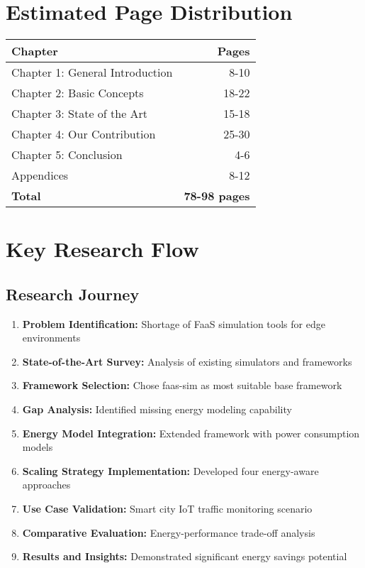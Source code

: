 \documentclass[12pt,a4paper]{report}
\begin{document}

\chapter*{Estimated Page Distribution}

\begin{table}[h]
\centering
\begin{tabular}{lr}
\hline
\textbf{Chapter} & \textbf{Pages} \\
\hline
Chapter 1: General Introduction & 8-10 \\
Chapter 2: Basic Concepts & 18-22 \\
Chapter 3: State of the Art & 15-18 \\
Chapter 4: Our Contribution & 25-30 \\
Chapter 5: Conclusion & 4-6 \\
Appendices & 8-12 \\
\hline
\textbf{Total} & \textbf{78-98 pages} \\
\hline
\end{tabular}
\end{table}


\chapter*{Key Research Flow}

\section*{Research Journey}
\begin{enumerate}[leftmargin=1cm]
    \item \textbf{Problem Identification:} Shortage of FaaS simulation tools for edge environments
    \item \textbf{State-of-the-Art Survey:} Analysis of existing simulators and frameworks
    \item \textbf{Framework Selection:} Chose faas-sim as most suitable base framework
    \item \textbf{Gap Analysis:} Identified missing energy modeling capability
    \item \textbf{Energy Model Integration:} Extended framework with power consumption models
    \item \textbf{Scaling Strategy Implementation:} Developed four energy-aware approaches
    \item \textbf{Use Case Validation:} Smart city IoT traffic monitoring scenario
    \item \textbf{Comparative Evaluation:} Energy-performance trade-off analysis
    \item \textbf{Results and Insights:} Demonstrated significant energy savings potential
\end{enumerate}
\end{document}
